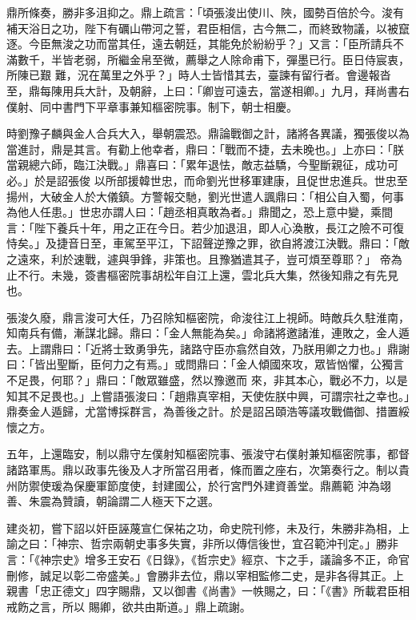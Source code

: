 \begin{pinyinscope}
 鼎所條奏，勝非多沮抑之。鼎上疏言：「頃張浚出使川、陜，國勢百倍於今。浚有補天浴日之功，陛下有礪山帶河之誓，君臣相信，古今無二，而終致物議，以被竄逐。今臣無浚之功而當其任，遠去朝廷，其能免於紛紛乎？」又言：「臣所請兵不滿數千，半皆老弱，所繼金帛至微，薦舉之人除命甫下，彈墨已行。臣日侍宸衷，所陳已艱
 難，況在萬里之外乎？」時人士皆惜其去，臺諫有留行者。會邊報沓至，鼎每陳用兵大計，及朝辭，上曰：「卿豈可遠去，當遂相卿。」九月，拜尚書右僕射、同中書門下平章事兼知樞密院事。制下，朝士相慶。



 時劉豫子麟與金人合兵大入，舉朝震恐。鼎論戰御之計，諸將各異議，獨張俊以為當進討，鼎是其言。有勸上他幸者，鼎曰：「戰而不捷，去未晚也。」上亦曰：「朕當親總六師，臨江決戰。」鼎喜曰：「累年退怯，敵志益驕，今聖斷親征，成功可必。」於是詔張俊
 以所部援韓世忠，而命劉光世移軍建康，且促世忠進兵。世忠至揚州，大破金人於大儀鎮。方警報交馳，劉光世遣人諷鼎曰：「相公自入蜀，何事為他人任患。」世忠亦謂人曰：「趙丞相真敢為者。」鼎聞之，恐上意中變，乘間言：「陛下養兵十年，用之正在今日。若少加退沮，即人心渙散，長江之險不可復恃矣。」及捷音日至，車駕至平江，下詔聲逆豫之罪，欲自將渡江決戰。鼎曰：「敵之遠來，利於速戰，遽與爭鋒，非策也。且豫猶遣其子，豈可煩至尊耶？」
 帝為止不行。未幾，簽書樞密院事胡松年自江上還，雲北兵大集，然後知鼎之有先見也。



 張浚久廢，鼎言浚可大任，乃召除知樞密院，命浚往江上視師。時敵兵久駐淮南，知南兵有備，漸謀北歸。鼎曰：「金人無能為矣。」命諸將邀諸淮，連敗之，金人遁去。上謂鼎曰：「近將士致勇爭先，諸路守臣亦翕然自效，乃朕用卿之力也。」鼎謝曰：「皆出聖斷，臣何力之有焉。」或問鼎曰：「金人傾國來攻，眾皆忷懼，公獨言不足畏，何耶？」鼎曰：「敵眾雖盛，然以豫邀而
 來，非其本心，戰必不力，以是知其不足畏也。」上嘗語張浚曰：「趙鼎真宰相，天使佐朕中興，可謂宗社之幸也。」鼎奏金人遁歸，尤當博採群言，為善後之計。於是詔呂頤浩等議攻戰備御、措置綏懷之方。



 五年，上還臨安，制以鼎守左僕射知樞密院事、張浚守右僕射兼知樞密院事，都督諸路軍馬。鼎以政事先後及人才所當召用者，條而置之座右，次第奏行之。制以貴州防禦使瑗為保慶軍節度使，封建國公，於行宮門外建資善堂。鼎薦範
 沖為翊善、朱震為贊讀，朝論謂二人極天下之選。



 建炎初，嘗下詔以奸臣誣蔑宣仁保祐之功，命史院刊修，未及行，朱勝非為相，上諭之曰：「神宗、哲宗兩朝史事多失實，非所以傳信後世，宜召範沖刊定。」勝非言：「《神宗史》增多王安石《日錄》，《哲宗史》經京、卞之手，議論多不正，命官刪修，誠足以彰二帝盛美。」會勝非去位，鼎以宰相監修二史，是非各得其正。上親書「忠正德文」四字賜鼎，又以御書《尚書》一帙賜之，曰：「《書》所載君臣相戒飭之言，所以
 賜卿，欲共由斯道。」鼎上疏謝。




\end{pinyinscope}
